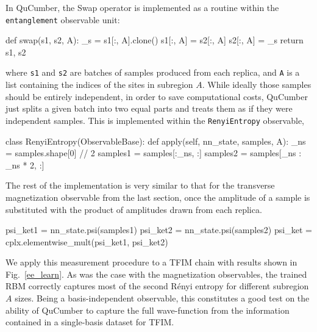 \documentclass[submission, Phys, hidelnks]{SciPost}
\begin{document}
In QuCumber, the Swap operator is implemented as a routine within the
\verb|entanglement| observable unit:
\begin{python}
def swap(s1, s2, A):
    _s = s1[:, A].clone()
    s1[:, A] = s2[:, A]
    s2[:, A] = _s
    return s1, s2
\end{python}
where \verb|s1| and \verb|s2| are batches of samples produced from each replica,
and \verb|A| is a list containing the indices of the sites in subregion $A$.
While ideally those samples should be entirely independent, in order to save
computational costs, QuCumber just splits a given batch into two equal parts and
treats them as if they were independent samples. This is implemented within the
\verb|RenyiEntropy| observable,
\begin{python}
class RenyiEntropy(ObservableBase):
    def apply(self, nn_state, samples, A):
        _ns = samples.shape[0] // 2
        samples1 = samples[:_ns, :]
        samples2 = samples[_ns : _ns * 2, :]
\end{python}
The rest of the implementation is very similar to that for the transverse
magnetization observable from the last section, once the amplitude of a sample
is substituted with the product of amplitudes drawn from each replica.
\begin{python}
psi_ket1 = nn_state.psi(samples1)
psi_ket2 = nn_state.psi(samples2)
psi_ket = cplx.elementwise_mult(psi_ket1, psi_ket2)
\end{python}

We apply this measurement procedure to a TFIM chain with results shown in
Fig.~\ref{ee_learn}. As was the case with the magnetization observables, the trained
RBM correctly captures  most of the second R\'enyi entropy for different subregion
$A$ sizes. Being a basis-independent observable, this constitutes a good test on
the ability of QuCumber to capture the full wave-function from the information contained
in a single-basis dataset for TFIM.
\end{document}
